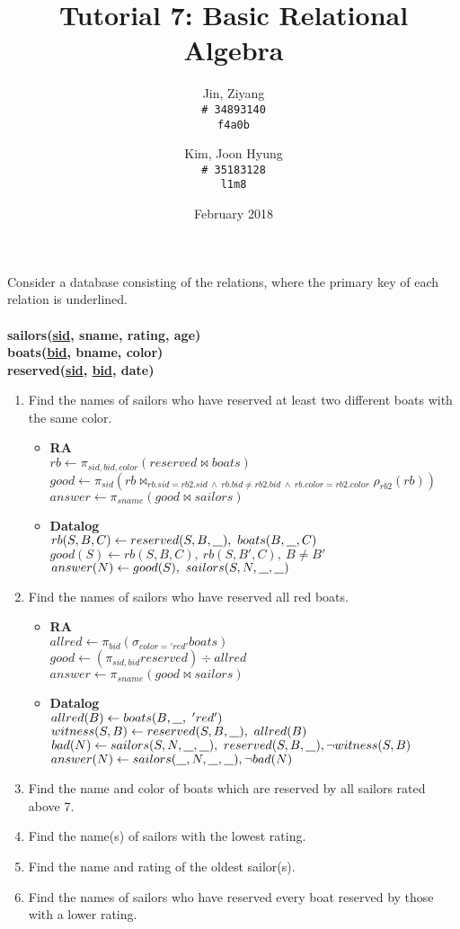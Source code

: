 \documentclass{article}
\title{Tutorial 7: Basic Relational Algebra}
\author{
	Jin, Ziyang\\
	\texttt{\# 34893140}\\
	\texttt{f4a0b}
	\and
	Kim, Joon Hyung\\
	\texttt{\# 35183128}\\
	\texttt{l1m8}
}
\date{February 2018}
\newcommand{\anyvar}{\underline{\hspace{0.8em}}}
\newcommand{\RA}{\textbf{RA}}
\newcommand{\DL}{\textbf{Datalog}}
\begin{document}
	\maketitle

\noindent Consider a database consisting of the relations, where the primary key of each relation is
underlined.\\
\\
\textbf{sailors(\underline{sid}, sname, rating, age)}\\
\textbf{boats(\underline{bid}, bname, color)}\\
\textbf{reserved(\underline{sid}, \underline{bid}, date)}

\begin{enumerate}
\item Find the names of sailors who have reserved at least two different boats with the same color.
	\begin{itemize}
	\item \RA\\
	$rb \gets \pi_{sid, bid, color} (reserved \bowtie boats) $\\
	$good \gets \pi_{sid} (rb \bowtie_{rb.sid = rb2.sid\ \land \ rb.bid \neq rb2.bid\ \land \ rb.color = rb2.color} \rho_{rb2}(rb) )$\\
	$answer \gets \pi_{sname} (good \bowtie sailors)$
	\item \DL \\
	$ rb(S, B, C) \gets reserved(S, B, \anyvar ),\ boats(B, \anyvar , C) $\\
	$ good(S) \gets rb(S, B, C),\ rb(S, B', C),\ B \neq B' $\\
	$ answer(N) \gets good(S),\ sailors(S, N, \anyvar, \anyvar)$
	\end{itemize}
\item Find the names of sailors who have reserved all red boats.
	\begin{itemize}
	\item \RA \\
	$ allred \gets \pi_{bid} (\sigma_{color = 'red'} boats)$ \\
	$ good \gets (\pi_{sid, bid} reserved) \div allred $\\
	$ answer \gets \pi_{sname}(good \bowtie sailors)$
	\item \DL \\
	$ allred(B) \gets boats(B, \anyvar,\  'red') $\\
	$ witness(S, B) \gets reserved(S, B, \anyvar),\ allred(B) $ \\
	$ bad(N) \gets sailors(S, N, \anyvar, \anyvar),\ reserved(S, B, \anyvar), \neg witness(S, B) $ \\
	$ answer(N) \gets sailors(\anyvar, N, \anyvar, \anyvar), \neg bad(N) $
	\end{itemize}
\item Find the name and color of boats which are reserved by all sailors rated above 7.
\item Find the name(s) of sailors with the lowest rating.
\item Find the name and rating of the oldest sailor(s).
\item Find the names of sailors who have reserved every boat reserved by those with a lower rating. 
\end{enumerate}
\end{document}
